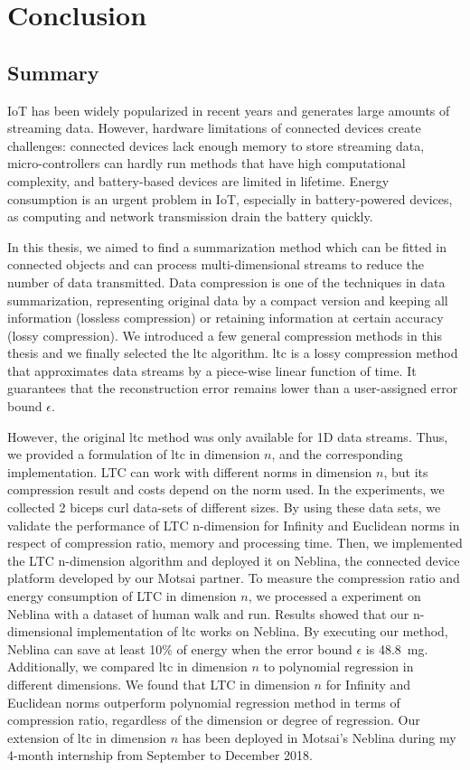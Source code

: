 \chapter{Conclusion}


\section{Summary}


IoT has been widely popularized in recent years and generates large amounts of
streaming data. However, hardware limitations of connected devices create
challenges: connected devices lack enough memory to store streaming data,
micro-controllers can hardly run methods that have high computational
complexity, and battery-based devices are limited in lifetime. Energy
consumption is an urgent problem in IoT, especially in battery-powered devices,
as computing and network transmission drain the battery quickly.

In this thesis, we aimed to find a summarization method which can be fitted
in connected objects and can process multi-dimensional streams to reduce
the number of data transmitted. Data compression is one of the techniques
in data summarization, representing original data by a compact version and
keeping all information (lossless compression) or retaining information at
certain accuracy (lossy compression). We introduced a few general
compression methods in this thesis and we finally selected the
\acrfull{ltc} algorithm. \acrshort{ltc} is a lossy compression method that
approximates data streams by a piece-wise linear function of time. It
guarantees that the reconstruction error remains lower than a user-assigned
error bound $\epsilon$. 

However, the original \acrshort{ltc} method was only available for 1D data
streams. Thus, we provided a formulation of \acrshort{ltc} in dimension $n$, and
the corresponding implementation. LTC can work with different norms in dimension
$n$, but its compression result and costs depend on the norm used. In the
experiments, we collected 2 biceps curl data-sets of different sizes. By using
these data sets, we validate the performance of LTC n-dimension for Infinity and
Euclidean norms in respect of compression ratio, memory and processing time.
Then, we implemented the LTC n-dimension algorithm and deployed it on Neblina,
the connected device platform developed by our Motsai partner. To measure the
compression ratio and energy consumption of LTC in dimension $n$, we processed a
experiment on Neblina with a dataset of human walk and run. Results showed that
our n-dimensional implementation of \acrshort{ltc} works on Neblina. By
executing our method, Neblina can save at least 10\% of energy when the error
bound $\epsilon$ is 48.8\ mg. 
Additionally, we compared \acrshort{ltc} in dimension $n$
to polynomial regression in different dimensions. We found that LTC in dimension
$n$ for Infinity and Euclidean norms outperform polynomial regression method in
terms of compression ratio, regardless of the dimension or degree of regression.
Our extension of \acrshort{ltc} in dimension $n$ has been deployed in Motsai's
Neblina during my 4-month internship from September to December 2018.

